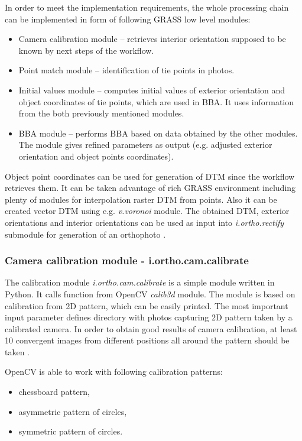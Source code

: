 \documentclass[a4paper,12pt]{article}
\newcommand{\term}[1]{%
{\it #1}%
}
\begin{document}
In order to meet the implementation requirements, the whole processing chain can be implemented in form
of following GRASS low level modules:

\begin{itemize}
\item Camera calibration module -- retrieves interior orientation supposed to be known by 
next steps of the workflow.
\item Point match module -- identification of tie points in photos.
\item Initial values module -- computes initial values of exterior orientation and 
object coordinates of tie points, which are used in BBA. It uses information from the both
previously mentioned modules.
\item BBA module -- performs BBA based on data obtained by the other modules.
The module gives refined parameters as output (e.g. adjusted exterior orientation and object points coordinates).   
\end{itemize}

Object point coordinates can be used for generation of DTM since the workflow retrieves them. 
It can be taken advantage of rich GRASS  environment
including plenty of modules for interpolation raster DTM from points. Also it can be 
created vector DTM using e.g. \term{v.voronoi} module. 
The obtained DTM, exterior orientations and interior orientations
can be used as input into \term{i.ortho.rectify} submodule for generation of an orthophoto . 

\subsubsection{Camera calibration module - i.ortho.cam.calibrate}

The calibration module \term{i.ortho.cam.calibrate} is a simple module written in Python. It calls
function from OpenCV \term{calib3d} module. The module is based on cali\-bration from 2D pattern, which can be easily printed. 
The most important input parameter defines directory with photos capturing 2D pattern 
taken by a calibrated camera. In order to obtain good results of camera calibration, at least 10 convergent images 
from different positions all around the pattern should be taken \cite{camera_calibration2013opencv}.

OpenCV is able to work with following calibration patterns:
\begin{itemize}
\item chessboard pattern,
\item asymmetric pattern of circles,
\item symmetric pattern of circles.
\end{itemize}
\end{document}
